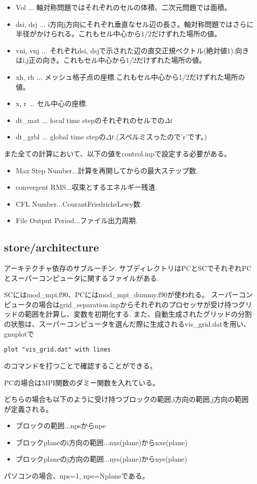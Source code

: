 \documentclass{jsarticle}
\begin{document}
\begin{itemize}
\begin{itemize}
\item Vol ... 軸対称問題ではそれぞれのセルの体積、二次元問題では面積。
\item dsi, dsj ... i方向j方向にそれぞれ垂直なセル辺の長さ。軸対称問題ではさらに半径がかけられる。これもセル中心から1/2だけずれた場所の値。
\item vni, vnj ... それぞれdsi, dsjで示された辺の直交正規ベクトル(絶対値1).向きはi,j正の向き。これもセル中心から1/2だけずれた場所の値。
\item xh, rh ... メッシュ格子点の座標.これもセル中心から1/2だけずれた場所の値。
\item x, r ... セル中心の座標.
\item dt\_mat ... local time stepのそれぞれのセルでの$\Delta t$
\item dt\_grbl ... global time stepの$\Delta t$.(スペルミスったので'r'です。)
\end{itemize}
\end{itemize}
また全ての計算において、以下の値をcontrol.inpで設定する必要がある。
\begin{itemize}
\item Max Step Number...計算を再開してからの最大ステップ数.
\item convergent RMS...収束とするエネルギー残渣.
\item CFL Number...CourantFriedrichsLewy数.
\item File Output Period...ファイル出力周期.
\end{itemize}
\subsection{store/architecture}%
アーキテクチャ依存のサブルーチン.
サブディレクトリはPCとSCでそれぞれPCとスーパーコンピュータに関するファイルがある.

SCにはmod\_mpi.f90、PCにはmod\_mpi\_dummy.f90が使われる。
スーパーコンピュータの場合はgrid\_separation.inpからそれぞれのプロセッサが受け持つグリッドの範囲を計算し、変数を初期化する.
また、自動生成されたグリッドの分割の状態は、スーパーコンピュータを選んだ際に生成されるvis\_grid.datを用い、gnuplotで
\begin{verbatim}
plot "vis_grid.dat" with lines
\end{verbatim}
のコマンドを打つことで確認することができる。

PCの場合はMPI関数のダミー関数を入れている。

どちらの場合も以下のように受け持つブロックの範囲,i方向の範囲,j方向の範囲が定義される。
\begin{itemize}
\item ブロックの範囲...npsからnpe
\item ブロックplaneのi方向の範囲...nxs(plane)からnxe(plane)
\item ブロックplaneのj方向の範囲...nys(plane)からnye(plane)
\end{itemize}
パソコンの場合、nps=1, npe=Nplaneである。
\end{document}
